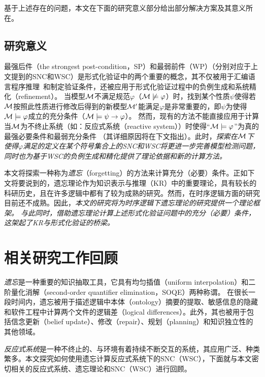 基于上述存在的问题，本文在下面的研究意义部分给出部分解决方案及其意义所在。

\subsection{研究意义}
最强后件（the strongest post-condition，SP）和最弱前件（WP）（分别对应于上文提到的SNC和WSC）是形式化验证中的两个重要的概念，其不仅被用于汇编语言程序推理~\cite{legato2002weakest}和制定验证条件\cite{DBLP:journals/ipl/Leino05}，还被应用于形式化验证过程中的负例生成\cite{dailler2018instrumenting}和系统精化（refinement）\cite{woodcock1990refinement}。
当模型${\cal M}$不满足规范$\varphi$（${\cal M}\not \models \varphi$）时，找到某个性质$\psi$使得若${\cal M}$按照此性质进行修改后得到的新模型${\cal M}'$能满足$\varphi$是非常重要的，即$\psi$为使得${\cal M}\models \varphi$成立的充分条件（${\cal M} \models \psi\rightarrow \varphi$）。
然而，现有的方法不能直接应用于计算当${\cal M}$为不终止系统（如：反应式系统（reactive system））时使得“${\cal M}\models \varphi$”为真的最强必要条件和最弱充分条件
（其详细原因将在下文指出）。此时，\emph{探索在${\cal M}$下使得$\varphi$满足的定义在某个符号集合上的SNC和WSC将更进一步完善模型检测问题，
同时也为基于WSC的负例生成和精化提供了理论依据和新的计算方法。}

本文将探索一种称为\emph{遗忘}（forgetting）的方法来计算充分（必要）条件。正如下文将要说到的，遗忘理论作为知识表示与推理（KR）中的重要理论，具有较长的科研历史，且在许多逻辑中都有了较为成熟的研究。然而，在时序逻辑方面的研究目前还不成熟。因此，\emph{本文的研究将为时序逻辑下遗忘理论的研究提供一个理论框架。
与此同时，借助遗忘理论计算上述形式化验证问题中的充分（必要）条件，这架起了KR与形式化验证的桥梁。}

\section{相关研究工作回顾}
\emph{遗忘}是一种重要的知识抽取工具，它具有均匀插值（uniform interpolation）和二阶量化消解（second-order quantifier elimination，SOQE）两种称谓。
在很长一段时间内，遗忘被用于描述逻辑中本体（ontology）摘要的提取、敏感信息的隐藏和软件工程中计算两个文件的逻辑差（logical differences）。此外，其也被用于包括信念更新（belief update）、修改（repair）、规划（planning）和知识独立性的其他领域。

{\em 反应式系统}是一种不终止的、与环境有着持续不断交互的系统，其应用广泛、种类繁多。本文探究如何使用遗忘计算反应式系统下的SNC（WSC），下面就与本文密切相关的反应式系统、遗忘理论和SNC（WSC）进行回顾。



